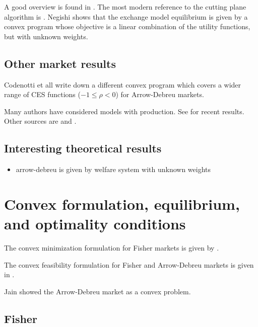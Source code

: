 \documentclass{article}
\begin{document}
A good overview is found in \cite{mccune2009algorithmic}. The most modern reference to the cutting plane algorithm is \cite{mccune2007extending}.
Negishi \cite{negishi1960welfare} shows that the exchange model equilibrium is given by a convex program whose objective is a linear combination of the utility functions, but with unknown weights.

\subsection{Other market results}

Codenotti et all \cite{codenotti2005market, codenotti2005marketCES} write down a different convex program which covers a wider range of CES functions ($-1 \leq \rho < 0$) for Arrow-Debreu markets.

Many authors have considered models with production. See \cite{garg2014computability} for recent results. Other sources are \cite{jain2005market} and \cite{codenotti2005marketExcess}. 

\subsection{Interesting theoretical results}
\begin{itemize}
\item arrow-debreu is given by welfare system with unknown weights
\end{itemize}


\section{Convex formulation, equilibrium, and optimality conditions}
The convex minimization formulation for Fisher markets is given by \cite{eisenberg1961aggregation}.

The convex feasibility formulation for Fisher and Arrow-Debreu markets is given in \cite{chen2007note,chen2010equilibrium}.


Jain \cite{jain2007polynomial} showed the Arrow-Debreu market as a convex problem.

\subsection{Fisher}
\end{document}

